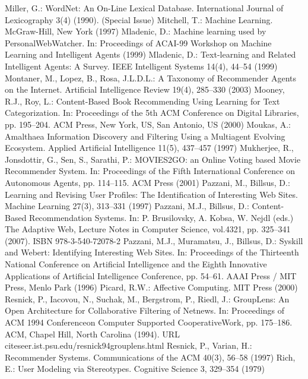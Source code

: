 \begin{thebibliography}{110}
Miller, G.: WordNet: An On-Line Lexical Database. International Journal of Lexicography 3(4) (1990). (Special Issue)
Mitchell, T.: Machine Learning. McGraw-Hill, New York (1997)
Mladenic, D.: Machine learning used by PersonalWebWatcher. In: Proceedings of ACAI-99 Workshop on Machine Learning and Intelligent Agents (1999)
Mladenic, D.: Text-learning and Related Intelligent Agents: A Survey. IEEE Intelligent Systems 14(4), 44–54 (1999)
Montaner, M., Lopez, B., Rosa, J.L.D.L.: A Taxonomy of Recommender Agents on the Internet. Artificial Intelligence Review 19(4), 285–330 (2003)
Mooney, R.J., Roy, L.: Content-Based Book Recommending Using Learning for Text Categorization. In: Proceedings of the 5th ACM Conference on Digital Libraries, pp. 195–204. ACM Press, New York, US, San Antonio, US (2000)
Moukas, A.: Amalthaea Information Discovery and Filtering Using a Multiagent Evolving Ecosystem. Applied Artificial Intelligence 11(5), 437–457 (1997)
Mukherjee, R., Jonsdottir, G., Sen, S., Sarathi, P.: MOVIES2GO: an Online Voting based Movie Recommender System. In: Proceedings of the Fifth International Conference on Autonomous Agents, pp. 114–115. ACM Press (2001)
Pazzani, M., Billsus, D.: Learning and Revising User Profiles: The Identification of Interesting Web Sites. Machine Learning 27(3), 313–331 (1997)
Pazzani, M.J., Billsus, D.: Content-Based Recommendation Systems. In: P. Brusilovsky, A. Kobsa, W. Nejdl (eds.) The Adaptive Web, Lecture Notes in Computer Science, vol.4321, pp. 325–341 (2007). ISBN 978-3-540-72078-2
Pazzani, M.J., Muramatsu, J., Billsus, D.: Syskill and Webert: Identifying Interesting Web Sites. In: Proceedings of the Thirteenth National Conference on Artificial Intelligence and the Eighth Innovative Applications of Artificial Intelligence Conference, pp. 54–61. AAAI Press / MIT Press, Menlo Park (1996)
Picard, R.W.: Affective Computing. MIT Press (2000)
Resnick, P., Iacovou, N., Suchak, M., Bergstrom, P., Riedl, J.: GroupLens: An Open Architecture for Collaborative Filtering of Netnews. In: Proceedings of ACM 1994 Conferenceon Computer Supported CooperativeWork, pp. 175–186. ACM, Chapel Hill, North Carolina (1994). URL citeseer.ist.psu.edu/resnick94grouplens.html
Resnick, P., Varian, H.: Recommender Systems. Communications of the ACM 40(3), 56–58 (1997)
Rich, E.: User Modeling via Stereotypes. Cognitive Science 3, 329–354 (1979)

\end{thebibliography}
